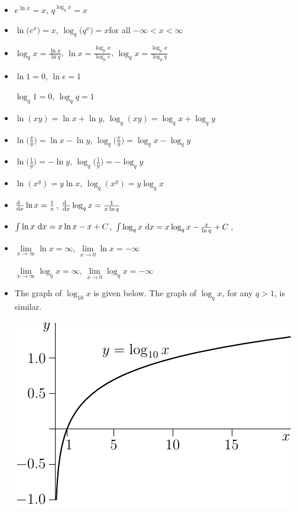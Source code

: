 \begin{itemize}
\item   
       $e^{\ln x}=x$,\quad  
       $q^{\log_q x}=x$
\item 
       $\ln \big(e^x\big)=x$,\quad
       $\log_q \big(q^x\big)=x$\quad for all $-\infty<x<\infty$ 
\item   
        $\log_q x=\frac{\ln x}{\ln q}$,\quad
        $\ln x=\frac{\log_p x}{\log_p e}$,\quad
        $\log_q x=\frac{\log_p x}{\log_p q}$
\item   
          $\ln 1=0$,\quad 
          $\ln e=1$


          $\log_q 1=0$,\quad 
          $\log_q q=1$

\item 
      $\ln(xy)=\ln x+\ln y$,\quad
      $\log_q(xy)=\log_q x+\log_q y$

\item 
     $\ln\big(\frac{x}{y}\big)=\ln x-\ln y$,\quad 
     $\log_q\big(\frac{x}{y}\big)=\log_q x-\log_q y$
 
\item 
     $\ln\big(\frac{1}{y}\big)=-\ln y$,\quad 
     $\log_q\big(\frac{1}{y}\big)=-\log_q y$

\item 
     $\ln(x^y)=y\ln x$,\quad
     $\log_q(x^y)=y\log_q x$

\item
    $\diff{\hfill}{x}\ln x = \frac{1}{x}$,\quad
    $\diff{\hfill}{x}\log_q x = \frac{1}{x\ln q}$

\item
    $\int \ln x\ \mathrm{d}x= x\ln x-x +C$,\quad
    $\int \log_q x\ \mathrm{d}x= x\log_q x-\frac{x}{\ln q} +C$,\quad

\item
    $\lim\limits_{x\rightarrow\infty}\ln x=\infty$,\quad 
           $\lim\limits_{x\rightarrow0}\ln x=-\infty$

    $\lim\limits_{x\rightarrow\infty}\log_q x=\infty$,\quad
           $\lim\limits_{x\rightarrow0}\log_q x=-\infty$ 

\item The graph of $\log_{10} x$ is given below. The graph of  $\log_q x$,
for any $q>1$, is similar.

\begin{center}
\includegraphics{logGraph10.pdf}
\end{center}

\end{itemize}






